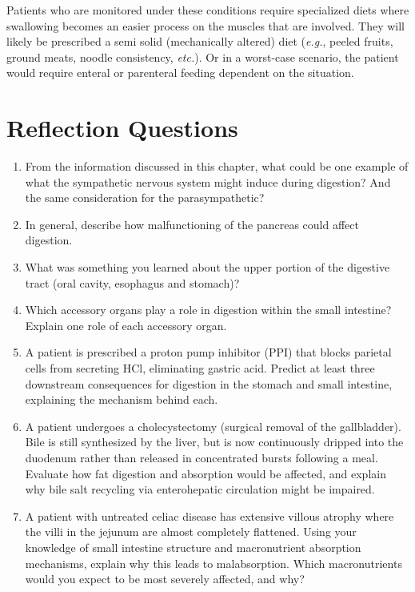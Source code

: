 \documentclass{tufte-handout}
\begin{document}
Patients who are monitored under these conditions require specialized diets where swallowing becomes an easier process on the muscles that are involved. They will likely be prescribed a semi solid (mechanically altered) diet (\textit{e.g.}, peeled fruits, ground meats, noodle consistency, \textit{etc.}). Or in a worst-case scenario, the patient would require enteral or parenteral feeding dependent on the situation. 

\section{Reflection Questions}
\begin{enumerate}
\item From the information discussed in this chapter, what could be one example of what the sympathetic nervous system might induce during digestion? And the same consideration for the parasympathetic?
\item In general, describe how malfunctioning of the pancreas could affect digestion.
\item What was something you learned about the upper portion of the digestive tract (oral cavity, esophagus and stomach)?
\item Which accessory organs play a role in digestion within the small intestine? Explain one role of each accessory organ.
\item A patient is prescribed a proton pump inhibitor (PPI) that blocks parietal cells from secreting HCl, eliminating gastric acid. Predict at least three downstream consequences for digestion in the stomach and small intestine, explaining the mechanism behind each.
\item A patient undergoes a cholecystectomy (surgical removal of the gallbladder). Bile is still synthesized by the liver, but is now continuously dripped into the duodenum rather than released in concentrated bursts following a meal. Evaluate how fat digestion and absorption would be affected, and explain why bile salt recycling via enterohepatic circulation might be impaired.
\item A patient with untreated celiac disease has extensive villous atrophy where the villi in the jejunum are almost completely flattened. Using your knowledge of small intestine structure and macronutrient absorption mechanisms, explain why this leads to malabsorption. Which macronutrients would you expect to be most severely affected, and why?
\end{enumerate}



\end{document}
